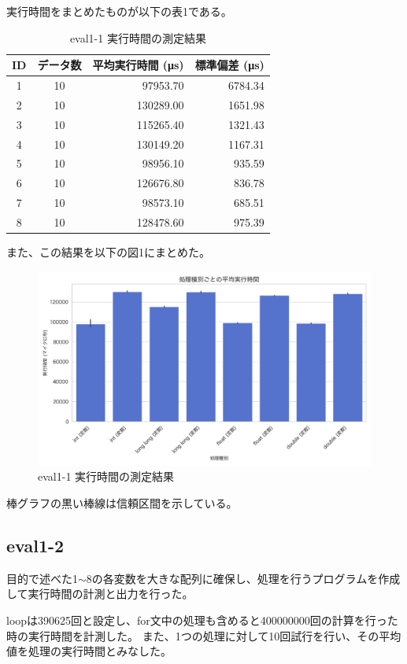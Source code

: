 \documentclass [11pt,a4paper,dvipdfmx]{ujarticle}
\begin{document}
実行時間をまとめたものが以下の表1である。
\begin{table}[htbp]
  \centering
  \caption{eval1-1 実行時間の測定結果}
  \label{tab:eval1-1-results}
  \begin{tabular}{ccrr}
    \toprule
    ID & データ数 & 平均実行時間 (μs) & 標準偏差 (μs) \\
    \midrule
    1 & 10 & 97953.70 & 6784.34 \\
    2 & 10 & 130289.00 & 1651.98 \\
    3 & 10 & 115265.40 & 1321.43 \\
    4 & 10 & 130149.20 & 1167.31 \\
    5 & 10 & 98956.10 & 935.59 \\
    6 & 10 & 126676.80 & 836.78 \\
    7 & 10 & 98573.10 & 685.51 \\
    8 & 10 & 128478.60 & 975.39 \\
    \bottomrule
  \end{tabular}
\end{table}

また、この結果を以下の図1にまとめた。
\begin{figure}[htbp]
  \centering
  \includegraphics[width=0.8\linewidth]{result1-1.png}
  \caption{eval1-1 実行時間の測定結果}
\end{figure}

棒グラフの黒い棒線は信頼区間を示している。
\clearpage
\subsection{eval1-2}
目的で述べた1$\sim$8の各変数を大きな配列に確保し、処理を行うプログラムを作成して実行時間の計測と出力を行った。

loopは390625回と設定し、for文中の処理も含めると400000000回の計算を行った時の実行時間を計測した。
また、1つの処理に対して10回試行を行い、その平均値を処理の実行時間とみなした。
\end{document}
